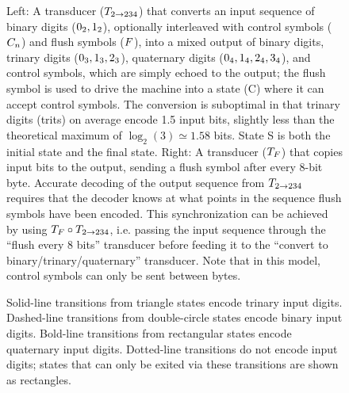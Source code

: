 \documentclass[english]{article}
\begin{document}
\newpage
\begin{figure}
\caption{
Left:
A transducer ($T_{2 \to 234}$) that converts an input sequence of binary digits ($0_2,1_2$),
optionally interleaved with
control symbols ($C_{n}$)
and flush symbols ($F$),
into a mixed output of binary digits,
trinary digits ($0_3,1_3,2_3$),
quaternary digits ($0_4,1_4,2_4,3_4$),
and control symbols, which are simply echoed to the output;
the flush symbol is used to drive the machine into a state (C) where it can accept control symbols.
The conversion is suboptimal in that trinary digits (trits) on average encode
1.5 input bits, slightly less than the theoretical maximum of $\log_2(3) \simeq 1.58$ bits.
State S is both the initial state and the final state.
Right:
A transducer ($T_F$) that copies input bits to the output, sending a flush symbol after every 8-bit byte.
Accurate decoding of the output sequence from $T_{2 \to 234}$ requires that the decoder
knows at what points in the sequence flush symbols have been encoded.
This synchronization can be achieved by using $T_F \circ T_{2 \to 234}$,
i.e. passing the input sequence through the ``flush every 8 bits'' transducer
before feeding it to the ``convert to binary/trinary/quaternary'' transducer.
Note that in this model, control symbols can only be sent between bytes.
}
\end{figure}

\newpage
\begin{figure}
\caption{
  Solid-line transitions from triangle states encode trinary input digits.
  Dashed-line transitions from double-circle states encode binary input digits.
  Bold-line transitions from rectangular states encode quaternary input digits.
  Dotted-line transitions do not encode input digits;
  states that can only be exited via these transitions are shown as rectangles.
}
\end{figure}

\newpage

\end{document}
